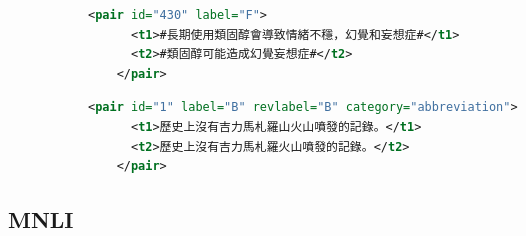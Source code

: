 \documentclass[12pt]{article}
\begin{document}
\begin{CJK*}{UTF8}{bkai}
\begin{spacing}{1.77}

\captionsetup[subfigure]{skip=-7pt}
\begin{figure}[ht!]
  \vspace{1.5em}
  \centering
  \caption{Examples of Sentence Pairs in the RITE2 and RITE-VAL Datasets}
  \label{fig:rite_example}

  \begin{subfigure}{\linewidth}
    \centering
    \begin{minipage}{\linewidth}
    \begin{lstlisting}[language=XML]
    <pair id="430" label="F">
      <t1>#長期使用類固醇會導致情緒不穩，幻覺和妄想症#</t1>
      <t2>#類固醇可能造成幻覺妄想症#</t2>
    </pair>
    \end{lstlisting}
    \end{minipage}
    \vspace{1.5em}
  \end{subfigure}

  \begin{subfigure}{\linewidth}
    \centering
    \begin{minipage}{\linewidth}
    \begin{lstlisting}[language=XML]
    <pair id="1" label="B" revlabel="B" category="abbreviation">
      <t1>歷史上沒有吉力馬札羅山火山噴發的記錄。</t1>
      <t2>歷史上沒有吉力馬札羅火山噴發的記錄。</t2>
    </pair>
    \end{lstlisting}
    \end{minipage}
  \end{subfigure}

  \addtocounter{figure}{-1}
\end{figure}

\subsection{MNLI}

\end{spacing}
\end{CJK*}
\end{document}
